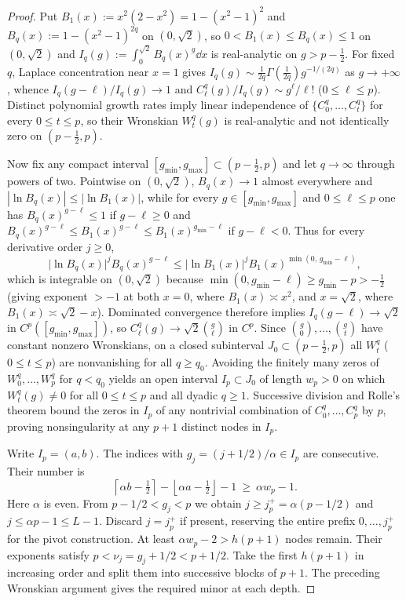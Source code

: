 \begin{proof}
Put $B_1(x):=x^2(2-x^2)=1-(x^2-1)^2$ and $B_q(x):=1-(x^2-1)^{2q}$ on $(0,\sqrt{2})$, so $0<B_1(x)\le B_q(x)\le 1$ on $(0,\sqrt{2})$ and $I_q(g):=\int_0^{\sqrt{2}} B_q(x)^g\dd x$ is real-analytic on $g>p-\frac{1}{2}$. For fixed $q$, Laplace concentration near $x=1$ gives $I_q(g)\sim\frac{1}{2q}\Gamma(\frac{1}{2q})g^{-1/(2q)}$ as $g\to+\infty$, whence $I_q(g-\ell)/I_q(g)\to 1$ and $C_\ell^q(g)/I_q(g)\sim g^\ell/\ell!$ ($0\le\ell\le p$). Distinct polynomial growth rates imply linear independence of $\{C_0^q,\dots,C_t^q\}$ for every $0\le t\le p$, so their Wronskian $W_t^q(g)$ is real-analytic and not identically zero on $(p-\frac{1}{2},p)$.

Now fix any compact interval $[g_{\min},g_{\max}]\subset(p-\frac{1}{2},p)$ and let $q\to\infty$ through powers of two. Pointwise on $(0,\sqrt{2})$, $B_q(x)\to 1$ almost everywhere and $|\ln B_q(x)|\le|\ln B_1(x)|$, while for every $g\in[g_{\min},g_{\max}]$ and $0\le\ell\le p$ one has $B_q(x)^{g-\ell}\le 1$ if $g-\ell\ge 0$ and $B_q(x)^{g-\ell}\le B_1(x)^{g-\ell}\le B_1(x)^{g_{\min}-\ell}$ if $g-\ell<0$. Thus for every derivative order $j\ge 0$,
\[
  \bigl|\ln B_q(x)\bigr|^j B_q(x)^{g-\ell}
  \le \bigl|\ln B_1(x)\bigr|^j B_1(x)^{\min(0,\,g_{\min}-\ell)},
\]
which is integrable on $(0,\sqrt{2})$ because $\min(0,g_{\min}-\ell)\ge g_{\min}-p>-\frac{1}{2}$ (giving exponent $>-1$ at both $x=0$, where $B_1(x)\asymp x^2$, and $x=\sqrt{2}$, where $B_1(x)\asymp\sqrt{2}-x$). Dominated convergence therefore implies $I_q(g-\ell)\to\sqrt{2}$ in $C^p([g_{\min},g_{\max}])$, so $C_\ell^q(g)\to\sqrt{2}\binom{g}{\ell}$ in $C^p$. Since $\binom{g}{0},\dots,\binom{g}{t}$ have constant nonzero Wronskians, on a closed subinterval $J_0\subset(p-\frac{1}{2},p)$ all $W_t^q$ ($0\le t\le p$) are nonvanishing for all $q\ge q_0$. Avoiding the finitely many zeros of $W_0^q,\dots,W_p^q$ for $q<q_0$ yields an open interval $I_p\subset J_0$ of length $w_p>0$ on which $W_t^q(g)\ne 0$ for all $0\le t\le p$ and all dyadic $q\ge 1$. Successive division and Rolle's theorem bound the zeros in $I_p$ of any nontrivial combination of $C_0^q,\dots,C_p^q$ by $p$, proving nonsingularity at any $p+1$ distinct nodes in $I_p$.

Write $I_p=(a,b)$. The indices with $g_j=(j+1/2)/\alpha\in I_p$ are consecutive. Their number is
\[
 \left\lceil\alpha b-\tfrac12\right\rceil
 -\left\lfloor\alpha a-\tfrac12\right\rfloor-1\ \ge\ \alpha w_p-1 .
\]
Here $\alpha$ is even. From $p-1/2<g_j<p$ we obtain
$j\ge j_p^+=\alpha(p-1/2)$ and $j\le\alpha p-1\le L-1$.
Discard $j=j_p^+$ if present, reserving the entire prefix $0,\ldots,j_p^+$ for the pivot construction. At least $\alpha w_p-2>h(p+1)$ nodes remain. Their exponents satisfy $p<\nu_j=g_j+1/2<p+1/2$. Take the first $h(p+1)$ in increasing order and split them into successive blocks of $p+1$. The preceding Wronskian argument gives the required minor at each depth.
\end{proof}

